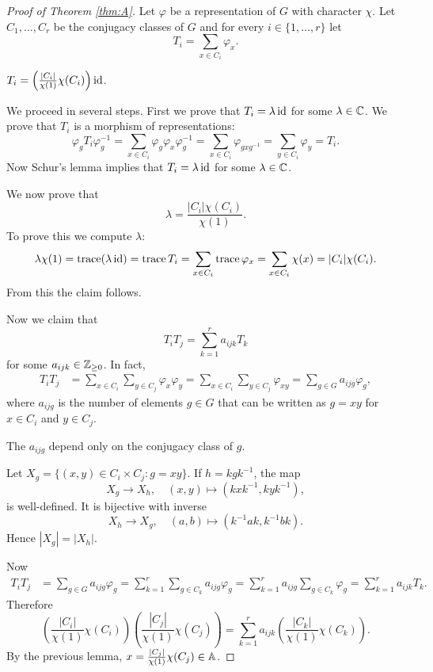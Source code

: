 \begin{proof}[Proof of Theorem \ref{thm:A}]
    Let $\varphi$ be a representation of $G$ with character $\chi$. 
    Let $C_1,\dots,C_r$ be the conjugacy classes of $G$ 
    and for every $i\in\{1,\dots,r\}$ let 
    \[
    T_i=\sum_{x\in C_i}\varphi_x. 
    \]
    
    \begin{claim}
        $T_i=\left(\frac{|C_i|}{\chi(1)}\chi(C_i)\right)\operatorname{id}$. 
    \end{claim}
    
    We proceed in several steps. First we prove that 
    $T_i=\lambda\operatorname{id}$ for some $\lambda\in\mathbb{C}$. 
    We prove that $T_i$ is a morphism of representations:
    \[
    \varphi_gT_i\varphi_g^{-1}=\sum_{x\in C_i}\varphi_g\varphi_x\varphi_g^{-1}
    =\sum_{x\in C_i}\varphi_{gxg^{-1}}=\sum_{y\in C_i}\varphi_y=T_i.
    \]
    Now Schur's lemma implies that $T_i=\lambda\operatorname{id}$ for some
    $\lambda\in\mathbb{C}$. 
    
    We now prove that 
    \[
    \lambda=\frac{|C_i|\chi(C_i)}{\chi(1)}.
    \]
    To prove
    this we compute $\lambda$:
    \[
    \lambda\chi(1)=\operatorname{trace}(\lambda\operatorname{id})
    =\operatorname{trace} T_i
    =\sum_{x\in C_i}\operatorname{trace}\varphi_x
    =\sum_{x\in C_i}\chi(x)
    =|C_i|\chi(C_i).
    \]
    From this the claim follows. 
    
    Now we claim that 
    \[
    T_iT_j=\sum_{k=1}^r a_{ijk}T_k
    \]
    for some $a_{ijk}\in\mathbb{Z}_{\geq0}$. In fact, 
    \begin{align*}
        T_iT_j &= \sum_{x\in C_i}\sum_{y\in C_j}\varphi_x\varphi_y
        =\sum_{x\in C_i}\sum_{y\in C_j}\varphi_{xy}
        =\sum_{g\in G}a_{ijg}\varphi_g,
    \end{align*}
    where $a_{ijg}$ is the number of elements $g\in G$ 
    that can be written 
    as $g=xy$ for $x\in C_i$ and $y\in C_j$. 
    
    \begin{claim}
        The $a_{ijg}$ depend only on the conjugacy class of $g$.
    \end{claim}
    
    Let $X_g=\{(x,y)\in C_i\times C_j:g=xy\}$. If $h=kgk^{-1}$, the map
    \[
    X_g\to X_h,\quad (x,y)\mapsto (kxk^{-1},kyk^{-1}),
    \]
    is well-defined. It is bijective with inverse
    \[
    X_h\to X_g,\quad
    (a,b)\mapsto (k^{-1}ak,k^{-1}bk).
    \]
    Hence $|X_g|=|X_h|$. 
    
    Now 
    \begin{align*}
        T_iT_j & 
        =\sum_{g\in G}a_{ijg}\varphi_g
        =\sum_{k=1}^r\sum_{g\in C_k}a_{ijg}\varphi_g
        =\sum_{k=1}^ra_{ijg}\sum_{g\in C_k}\varphi_g
        =\sum_{k=1}^ra_{ijk}T_k.
    \end{align*}
    Therefore 
    \begin{equation}
        \label{eq:omega}
    \left(\frac{|C_i|}{\chi(1)}\chi(C_i)\right)
    \left(\frac{|C_j|}{\chi(1)}\chi(C_j)\right)
    =\sum_{k=1}^r a_{ijk}\left(\frac{|C_k|}{\chi(1)}\chi(C_k)\right).
    \end{equation}
    By the previous lemma, $x=\frac{|C_j|}{\chi(1)}\chi(C_j)\in\mathbb{A}$.
\end{proof}

